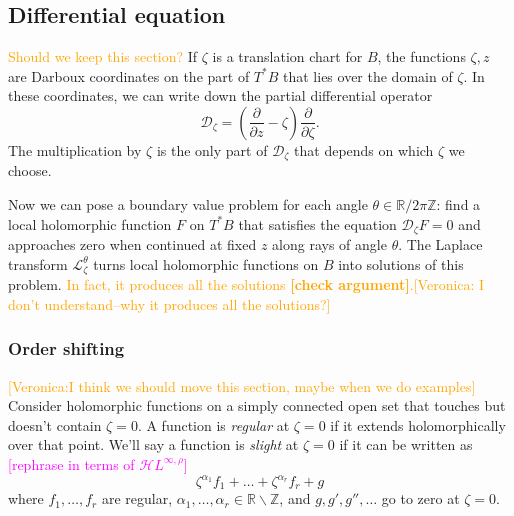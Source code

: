 \documentclass{article}
\theoremstyle{definition}
\newcommand{\Z}{\mathbb{Z}}
\newcommand{\R}{\mathbb{R}}
\newcommand{\holoL}[1]{\mathcal{H}L^{#1}} %
\newcommand{\laplacepde}{\mathcal{D}}
\newcommand{\laplace}{\mathcal{L}}
\begin{document}
\color{black}

\subsection{Differential equation}
\textcolor{orange}{Should we keep this section?}
If $\zeta$ is a translation chart for $B$, the functions $\zeta, z$ are Darboux coordinates on the part of $T^*B$ that lies over the domain of $\zeta$. In these coordinates, we can write down the partial differential operator
\begin{equation}%
\laplacepde_\zeta = \left(\frac{\partial}{\partial z} - \zeta\right) \frac{\partial}{\partial \zeta}.
\end{equation}
The multiplication by $\zeta$ is the only part of $\laplacepde_\zeta$ that depends on which $\zeta$ we choose.

Now we can pose a boundary value problem for each angle $\theta \in \R/2\pi\Z$: find a local holomorphic function $F$ on $T^*B$ that satisfies the equation $\laplacepde_\zeta F = 0$ and approaches zero when continued at fixed $z$ along rays of angle $\theta$.
The Laplace transform $\laplace_\zeta^\theta$ turns local holomorphic functions on $B$ into solutions of this problem. \textcolor{orange}{In fact, it produces all the solutions \textbf{[check argument]}.[Veronica: I don't understand--why it produces all the solutions?]}

\subsubsection{Order shifting}\label{shifting}
\textcolor{orange}{[Veronica:I think we should move this section, maybe when we do examples]}
Consider holomorphic functions on a simply connected open set that touches but doesn't contain $\zeta = 0$. A function is {\em regular} at $\zeta = 0$ if it extends holomorphically over that point. We'll say a function is {\em slight} at $\zeta = 0$ if it can be written as \textcolor{magenta}{[rephrase in terms of $\holoL{\infty, \rho}$]}
\begin{equation}\label{eqn:slight-defn}
\zeta^{\alpha_1} f_1 + \ldots + \zeta^{\alpha_r} f_r + g
\end{equation}
where $f_1, \ldots, f_r$ are regular, $\alpha_1, \ldots, \alpha_r \in \R \smallsetminus \Z$, and $g, g', g'', \ldots$ go to zero at $\zeta = 0$.
\end{document}

